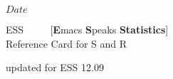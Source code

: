 \documentclass[a4paper]{article}
\begin{document}
\SVN $Date$
\begin{center}
  {\LARGE ESS \ \ \ \ {\large
      [\textbf{E}macs \textbf{S}peaks \textbf{Statistics}]}
      \\[.5ex] Reference Card for S and R}

  \smallskip

  {\small updated for ESS 12.09}%
  \\[1ex] {\tiny \SVNDate}
\end{center}
\end{document}
